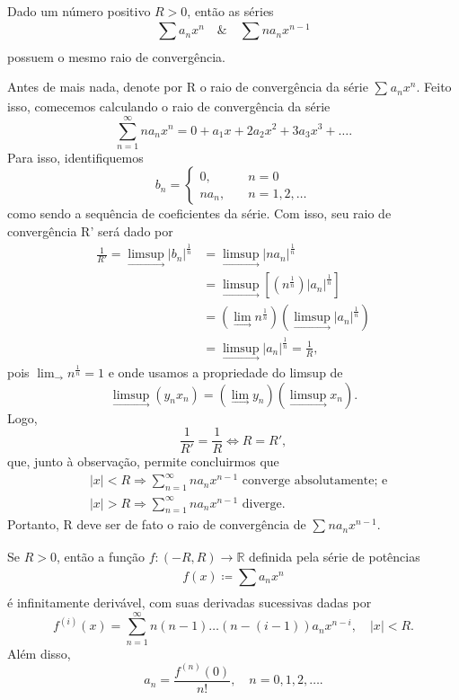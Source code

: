 \documentclass[../analysisII_notes.tex]{subfiles}
\begin{document}
\begin{lemma*}
	Dado um número positivo \(R > 0\), então as séries
	\[
		\sum\limits_{}^{}a_{n}x^{n}\quad\&\quad \sum\limits_{}^{}na_{n}x^{n-1}
	\]
	possuem o mesmo raio de convergência.
\end{lemma*}
\begin{proof*}
	Antes de mais nada, denote por R o raio de convergência da série \(\sum\limits_{}^{}a_{n}x^{n}\). Feito isso, comecemos calculando o raio de convergência da série
	\[
		\sum\limits_{n=1}^{\infty}na_{n}x^{n} = 0 + a_{1}x + 2a_2x^{2} + 3a_3x^{3} +\dotsc .
	\]
	Para isso, identifiquemos
	\[
		b_{n} = \left\{\begin{array}{ll}
			0,      & \quad n=0            \\
			na_{n}, & \quad n=1, 2, \dotsc
		\end{array}\right.
	\]
	como sendo a sequência de coeficientes da série. Com isso, seu raio de convergência R' será dado por
	\begin{align*}
		\frac{1}{R'} = \limsup_{\to }|b_{n}|^{\frac{1}{n}} & = \limsup_{\to }|na_{n}|^{\frac{1}{n}}                              \\
		                                                   & = \limsup_{\to }[(n^{\frac{1}{n}})|a_{n}|^{\frac{1}{n}}]            \\
		                                                   & = (\lim_{\to }n^{\frac{1}{n}})(\limsup_{\to }|a_{n}|^{\frac{1}{n}}) \\
		                                                   & = \limsup_{\to }|a_{n}|^{\frac{1}{n}}=\frac{1}{R},
	\end{align*}
	pois \(\lim_{\to }n^{\frac{1}{n}} = 1\) e onde usamos a propriedade do limsup de
	\[
		\limsup_{\to }(y_{n}x_{n}) = (\lim_{\to }y_{n})(\limsup_{\to }x_{n}).
	\]
	Logo,
	\[
		\frac{1}{R'} = \frac{1}{R} \Longleftrightarrow R = R',
	\]
	que, junto à observação, permite concluirmos que
	\begin{align*}
		 & |x| < R \Rightarrow \sum\limits_{n=1}^{\infty}na_{n}x^{n-1} \text{ converge absolutamente; e} \\
		 & |x| > R \Rightarrow \sum\limits_{n=1}^{\infty}na_{n}x^{n-1} \text{ diverge.}
	\end{align*}
	Portanto, R deve ser de fato o raio de convergência de \(\sum\limits_{}^{}na_{n}x^{n-1}.\) \qedsymbol
\end{proof*}
\begin{theorem*}
	Se \(R > 0\), então a função \(f:(-R, R)\rightarrow \mathbb{R}\) definida pela série de potências
	\[
		f(x)\coloneqq \sum\limits_{}^{}a_{n}x^{n}
	\]
	é infinitamente derivável, com suas derivadas sucessivas dadas por
	\[
		f^{(i)}(x) = \sum\limits_{n=1}^{\infty}n(n-1)\dotsc (n-(i-1))a_{n}x^{n-i},\quad |x|<R.
	\]
	Além disso,
	\[
		a_{n} = \frac{f^{(n)}(0)}{n!},\quad n=0,1,2,\dotsc .
	\]
\end{theorem*}
\end{document}
